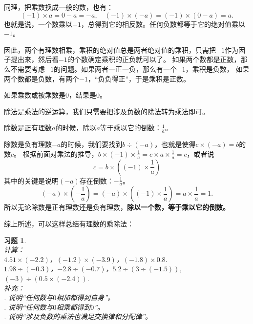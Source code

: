 \documentclass[12pt,UTF8]{ctexbook}
\newtheorem{xt}{习题}[section]
\begin{document}
同理，把乘数换成一般的数，也有：
$$(-1) \times a =  0 - a = -a, \quad (-1) \times (-a) = (-1) \times (0 - a) = a.$$
也就是说，一个数乘以$-1$，总得到它的相反数。任何负数都等于它的绝对值乘以$-1$。

因此，两个有理数相乘，乘积的绝对值总是两者绝对值的乘积，只需把$-1$作为因子提出来，然后看$-1$的个数确定乘积的正负就可以了。
如果两个数都是正数，那么不需要考虑$-1$的问题。如果两者一正一负，那么有一个$-1$，乘积是负数，
如果两个数都是负数，有两个$-1$，“负负得正”，于是乘积是正数。

如果乘数或被乘数是$0$，结果是$0$。

除法是乘法的逆运算，我们只需要把涉及负数的除法转为乘法即可。

除数是正有理数$a$的时候，除以$a$等于乘以它的倒数：$\frac{1}{a}$。

除数是负有理数$-a$的时候，我们要找到$b \div (-a)$，也就是使得$c \times (-a) = b$的数$c$。
根据前面对乘法的推导，$ b \times (-1) \times \frac{1}{a} = c \times a \times \frac{1}{a} = c$，或者说
$$c = b\times \left((-1) \times \frac{1}{a}\right)$$
其中的关键是说明$(-a)$存在倒数：$-\frac{1}{a}$。
$$ (-a)\times \left(-\frac{1}{a}\right) = (-a)\times \left((-1) \times \frac{1}{a}\right) = a \times \frac{1}{a} = 1. $$
所以无论除数是正有理数还是负有理数，\textbf{除以一个数，等于乘以它的倒数。}

综上所述，可以这样总结有理数的乘除法：
\begin{center}
\end{center}

\begin{xt}\label{xt:3-0-1}
    \mbox{}\\
    \indent 计算：\\
    \indent $4.51 \times (-2.2)$，$(-1.2) \times (-3.9)$，$(-1.8)\times 0.8.$ \\
    \indent $1.98 \div (-0.3)$，$-2.8 \div (-0.7)$，$5.2 \div (3 \div (-1.5))$, $(-3) \div (0.5 \times (-2.4)).$ \\
    \indent 补充：\\
    . 说明“任何数与$0$相加都得到自身”。\\
    . 说明“任何数与$0$相乘都得到$0$”。\\
    . 说明“涉及负数的乘法也满足交换律和分配律”。
\end{xt}
\end{document}
